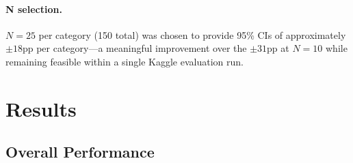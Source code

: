 \documentclass[12pt,a4paper]{article}
\begin{document}
\paragraph{N selection.}
$N=25$ per category (150 total) was chosen to provide 95\% CIs of approximately
$\pm 18$pp per category---a meaningful improvement over the $\pm 31$pp at $N=10$
while remaining feasible within a single Kaggle evaluation run.

\section{Results}
\label{sec:results}

\subsection{Overall Performance}
\end{document}
